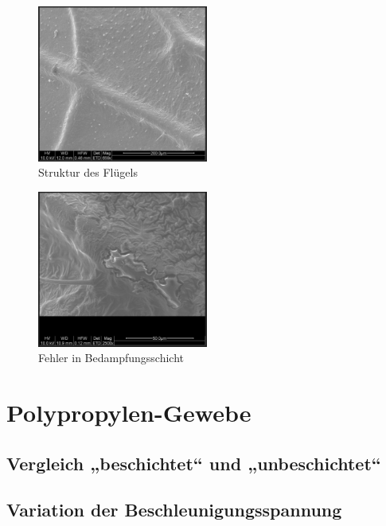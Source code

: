 \documentclass[12pt,english,ngerman]{scrartcl}
\begin{document}
\begin{figure}[H]
	\begin{center}
		\includegraphics[width =0.5\textwidth]{./figures/flugel.png}
	\end{center}
	\caption{Struktur des Flügels}
    \label{fig:flugel}
\end{figure}

\begin{figure}[H]
	\begin{center}
		\includegraphics[width =0.5\textwidth]{./figures/damage.png}
	\end{center}
	\caption{Fehler in Bedampfungsschicht}
    \label{fig:damage}
\end{figure}


\section{Polypropylen-Gewebe}

\subsection{Vergleich „beschichtet“ und „unbeschichtet“}


\subsection{Variation der Beschleunigungsspannung}
\end{document}
